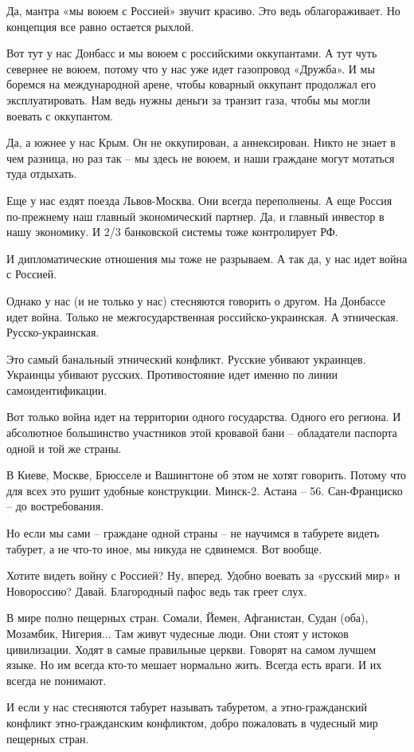 Да, мантра «мы воюем с Россией» звучит красиво. Это ведь облагораживает. Но
концепция все равно остается рыхлой.

Вот тут у нас Донбасс и мы воюем с российскими оккупантами. А тут чуть севернее
не воюем, потому что у нас уже идет газопровод «Дружба». И мы боремся на
международной арене, чтобы коварный оккупант продолжал его эксплуатировать. Нам
ведь нужны деньги за транзит газа, чтобы мы могли воевать с оккупантом.


Да, а южнее у нас Крым. Он не оккупирован, а аннексирован. Никто не знает в чем
разница, но раз так – мы здесь не воюем, и наши граждане могут мотаться туда
отдыхать.

Еще у нас ездят поезда Львов-Москва. Они всегда переполнены. А еще Россия
по-прежнему наш главный экономический партнер. Да, и главный инвестор в нашу
экономику. И 2/3 банковской системы тоже контролирует РФ.

И дипломатические отношения мы тоже не разрываем. А так да, у нас идет война с
Россией.

Однако у нас (и не только у нас) стесняются говорить о другом. На Донбассе идет
война. Только не межгосударственная российско-украинская. А этническая.
Русско-украинская.

Это самый банальный этнический конфликт. Русские убивают украинцев. Украинцы
убивают русских. Противостояние идет именно по линии самоидентификации.

Вот только война идет на территории одного государства. Одного его региона. И
абсолютное большинство участников этой кровавой бани – обладатели паспорта
одной и той же страны.


В Киеве, Москве, Брюсселе и Вашингтоне об этом не хотят говорить. Потому что
для всех это рушит удобные конструкции. Минск-2. Астана – 56. Сан-Франциско –
до востребования.

Но если мы сами – граждане одной страны – не научимся в табурете видеть
табурет, а не что-то иное, мы никуда не сдвинемся. Вот вообще.

Хотите видеть войну с Россией? Ну, вперед. Удобно воевать за «русский мир» и
Новороссию? Давай. Благородный пафос ведь так греет слух.


В мире полно пещерных стран. Сомали, Йемен, Афганистан, Судан (оба), Мозамбик,
Нигерия... Там живут чудесные люди. Они стоят у истоков цивилизации. Ходят в
самые правильные церкви. Говорят на самом лучшем языке. Но им всегда кто-то
мешает нормально жить. Всегда есть враги. И их всегда не понимают.

И если у нас стесняются табурет называть табуретом, а этно-гражданский конфликт
этно-гражданским конфликтом, добро пожаловать в чудесный мир пещерных стран.


